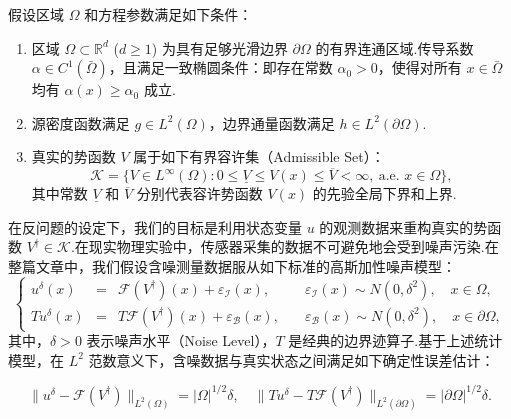\begin{assumption}[正则性与有界性假设]\label{ass:tikpinn}
假设区域 $\Omega$ 和方程参数满足如下条件：
\begin{enumerate}
\item[(a)] 区域 $\Omega\subset\mathbb{R}^{d}$ ($d\geq1$) 为具有足够光滑边界 $\partial\Omega$ 的有界连通区域.传导系数 $\alpha\in C^{1}(\bar{\Omega})$，且满足一致椭圆条件：即存在常数 $\alpha_0>0$，使得对所有 $x\in\bar{\Omega}$ 均有 $\alpha(x)\geq\alpha_0$ 成立.
\item[(b)] 源密度函数满足 $g\in L^{2}(\Omega)$，边界通量函数满足 $h\in L^{2}(\partial\Omega)$.
\item[(c)] 真实的势函数 $V$ 属于如下有界容许集（Admissible Set）：
\begin{equation}\label{eq:box}
\mathcal{K}=\{V\in L^{\infty}(\Omega):0\leq\underline{V}\leq V(x)\leq\overline{V}<\infty,~\text{a.e. } x\in\Omega\},
\end{equation}
其中常数 $\underline{V}$ 和 $\overline{V}$ 分别代表容许势函数 $V(x)$ 的先验全局下界和上界.
\end{enumerate}
\end{assumption}

在反问题的设定下，我们的目标是利用状态变量 $u$ 的观测数据来重构真实的势函数 $V^\dagger \in \mathcal{K}$.在现实物理实验中，传感器采集的数据不可避免地会受到噪声污染.在整篇文章中，我们假设含噪测量数据服从如下标准的高斯加性噪声模型：
\begin{equation}\label{eq:measurement}
\left\{
\begin{array}{rcll}
u^{\delta}(x)&=&\mathcal{F}(V^{\dagger})(x)+\varepsilon_{\mathcal{I}}(x),\quad &\varepsilon_{\mathcal{I}}(x)\sim N(0,\delta^{2}),\quad x\in\Omega, \\ 
Tu^{\delta}(x)&=&T\mathcal{F}(V^{\dagger})(x)+\varepsilon_{\mathcal{B}}(x),\quad &\varepsilon_{\mathcal{B}}(x)\sim N(0,\delta^{2}),\quad x\in\partial\Omega,
\end{array}
\right.
\end{equation}
其中，$\delta > 0$ 表示噪声水平（Noise Level），$T$ 是经典的边界迹算子.基于上述统计模型，在 $L^2$ 范数意义下，含噪数据与真实状态之间满足如下确定性误差估计：

\begin{equation}\label{eq:delta}
\|u^{\delta}-\mathcal{F}(V^{\dagger})\|_{L^{2}(\Omega)}=|\Omega|^{1/2}\delta, \quad \|Tu^{\delta}-T\mathcal{F}(V^{\dagger})\|_{L^{2}(\partial\Omega)}=|\partial\Omega|^{1/2}\delta.
\end{equation}

